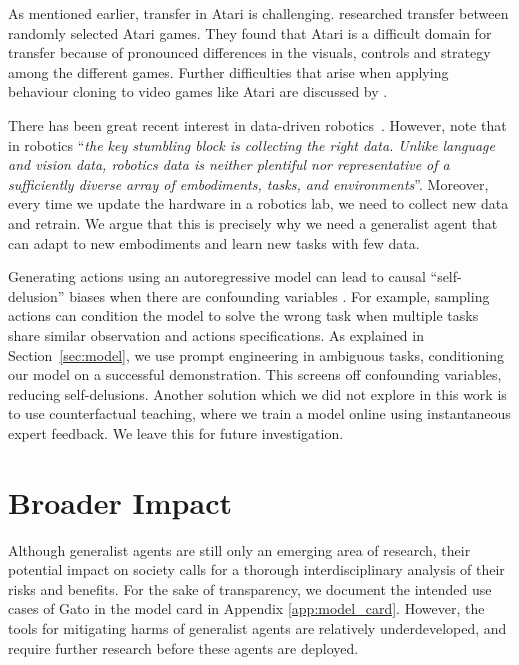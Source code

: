 \documentclass[10pt]{article} \usepackage[accepted]{tmlr}
\newcommand{\model}{{Gato}}
\begin{document}
As mentioned earlier, transfer in Atari is challenging.
\cite{rusu2016progressive} researched transfer between randomly selected Atari games. They found that Atari is a difficult domain for transfer because of pronounced differences in the visuals, controls and strategy among the different games.
Further difficulties that arise when applying behaviour cloning to video games like Atari are discussed by \cite{kanervisto2020benchmarking}.

There has been great recent interest in data-driven robotics~\citep{cabi2019scaling,chen2021learning}. However,
\cite{bommasani2021opportunities} note that in robotics ``\emph{the key stumbling block is collecting the right data. Unlike language and vision data, robotics data is neither plentiful nor representative of a sufficiently diverse array of
embodiments, tasks, and environments}''. Moreover, every time we update the hardware in a robotics lab, we need to collect new data and retrain. We argue that this is precisely why we need a generalist agent that can adapt to new embodiments and learn new tasks with few data.   

Generating actions using an autoregressive model can lead to causal ``self-delusion'' biases when there are confounding variables \citep{ortega2021shaking}. For example, sampling actions can condition the model to solve the wrong task when multiple tasks share similar observation and actions specifications. As explained in Section~\ref{sec:model}, we use prompt engineering in ambiguous tasks, conditioning our model on a successful demonstration. This screens off confounding variables, reducing self-delusions. Another solution which we did not explore in this work is to use counterfactual teaching, where we train a model online using instantaneous expert feedback. We leave this for future investigation.


\section{Broader Impact}
\label{sec:safety}


Although generalist agents are still only an emerging area of research, their potential impact on society calls for a thorough interdisciplinary analysis of their risks and benefits. 
For the sake of transparency, we document the intended use cases of \model{} in the model card in Appendix \ref{app:model_card}.
However, the tools for mitigating harms of generalist agents are relatively underdeveloped, and require further research before these agents are deployed.
\end{document}
